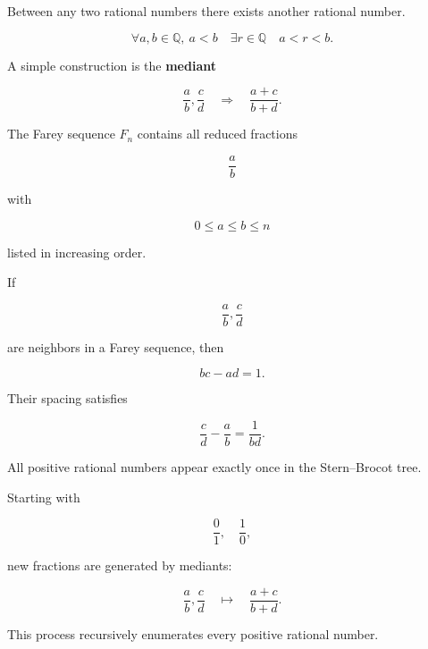 \medskip


\begin{tcolorbox}[colback=gray!6, colframe=gray!40, arc=2pt,
title={Density of $\mathbb{Q}$}]

Between any two rational numbers there exists another rational number.

\[
\forall a,b\in\mathbb{Q},\ a<b
\quad
\exists r\in\mathbb{Q}
\quad
a<r<b.
\]

A simple construction is the \textbf{mediant}

\[
\frac{a}{b},\frac{c}{d}
\quad\Rightarrow\quad
\frac{a+c}{b+d}.
\]

\end{tcolorbox}

\medskip


\begin{tcolorbox}[colback=gray!6, colframe=gray!40, arc=2pt,
title={Farey Sequences}]

The Farey sequence $F_n$ contains all reduced fractions

\[
\frac{a}{b}
\]

with

\[
0\le a\le b\le n
\]

listed in increasing order.

If

\[
\frac{a}{b},\frac{c}{d}
\]

are neighbors in a Farey sequence, then

\[
bc-ad=1.
\]

Their spacing satisfies

\[
\frac{c}{d}-\frac{a}{b}=\frac{1}{bd}.
\]

\end{tcolorbox}

\medskip


\begin{tcolorbox}[colback=gray!6, colframe=gray!40, arc=2pt,
title={Stern--Brocot Tree}]

All positive rational numbers appear exactly once in the
Stern–Brocot tree.

Starting with

\[
\frac{0}{1},\quad\frac{1}{0},
\]

new fractions are generated by mediants:

\[
\frac{a}{b},\frac{c}{d}
\quad\mapsto\quad
\frac{a+c}{b+d}.
\]

This process recursively enumerates every positive rational number.

\end{tcolorbox}

